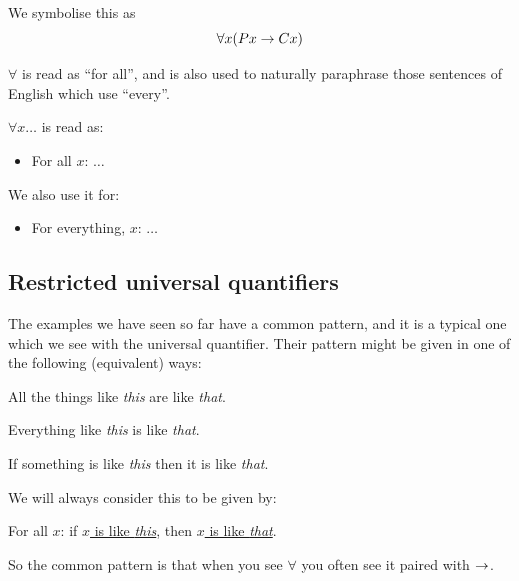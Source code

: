 We symbolise this as $$\forall x(Px\rightarrow Cx)$$



$\forall$ is read as ``for all'', and is also used to naturally paraphrase those sentences of English which use ``every''. 

\begin{highlighted}
	$\forall x\ldots$ is read as:
	\begin{itemize}
		\item For all $x$: $\ldots$
	\end{itemize}
	We also use it for:
	\begin{itemize}
		\item For everything, $x$: $\ldots$
	\end{itemize}
\end{highlighted}








\subsection{Restricted universal quantifiers}
The examples we have seen so far have a common pattern, and it is a typical one which we see with the universal quantifier. Their pattern might be given in one of the following (equivalent) ways:
\begin{samplesent}
	\item All the things like \emph{this} are like \emph{that}.
	\item Everything like \emph{this} is like \emph{that}.
	\item If something is like \emph{this} then it is like \emph{that}. 
\end{samplesent}

We will always consider this to be given by: 
\begin{samplesent}
	\item[] For all $x$: if \underline{$x$ is like \emph{this}}, then \underline{$x$ is like \emph{that}}. 
\end{samplesent}

So the common pattern is that when you see $\forall$ you often see it paired with $\rightarrow$. 



